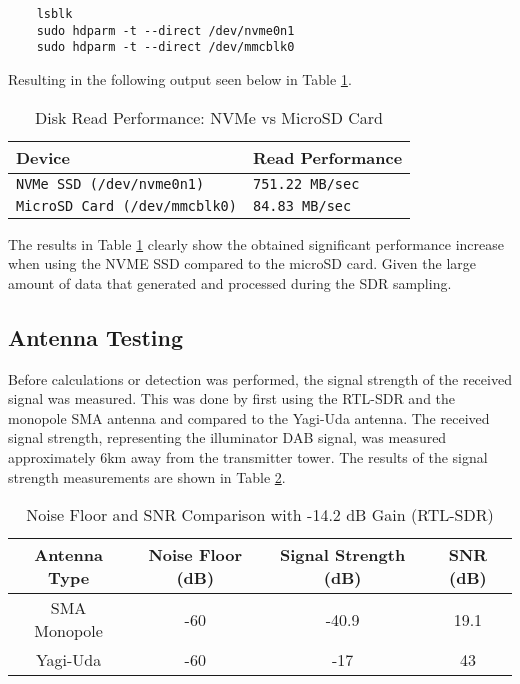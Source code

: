 \begin{verbatim}
    lsblk
    sudo hdparm -t --direct /dev/nvme0n1 
    sudo hdparm -t --direct /dev/mmcblk0
\end{verbatim}

\noindent Resulting in the following output seen below in Table \ref{tab:diskperf}.

\begin{table}[h!]
    \centering
    \caption{Disk Read Performance: NVMe vs MicroSD Card \label{tab:diskperf}}
    \begin{tabular}{|l|l|}
    \hline
    \textbf{Device} & \textbf{Read Performance} \\ \hline
    \texttt{NVMe SSD (\texttt{/dev/nvme0n1})} & \texttt{751.22 MB/sec} \\ \hline
    \texttt{MicroSD Card (\texttt{/dev/mmcblk0})} & \texttt{84.83 MB/sec} \\ \hline
    \end{tabular}
\end{table}

The results in Table \ref{tab:diskperf} clearly show the obtained significant performance increase when using the NVME SSD compared to the microSD card. Given the large amount of data that generated and processed during the SDR sampling. 

\subsection{Antenna Testing \label{sec:antennaVerification}}

Before calculations or detection was performed, the signal strength of the received signal was measured. This was done by first using the RTL-SDR and the monopole SMA antenna and compared to the Yagi-Uda antenna. The received signal strength, representing the illuminator DAB signal, was measured approximately 6km away from the transmitter tower. The results of the signal strength measurements are shown in Table \ref{tab:signalstrength}.

\begin{table}[h!]
    \centering
    \caption{Noise Floor and SNR Comparison with -14.2 dB Gain (RTL-SDR)}
    \label{tab:signalstrength}
    \begin{tabular}{|c|c|c|c|}
        \hline
        \textbf{Antenna Type} & \textbf{Noise Floor (dB)} & \textbf{Signal Strength (dB)} & \textbf{SNR (dB)} \\ \hline
        SMA Monopole & -60 & -40.9 & 19.1 \\ \hline
        Yagi-Uda     & -60 & -17   & 43   \\ \hline
    \end{tabular}
    \vspace{0.5cm}
\end{table}

